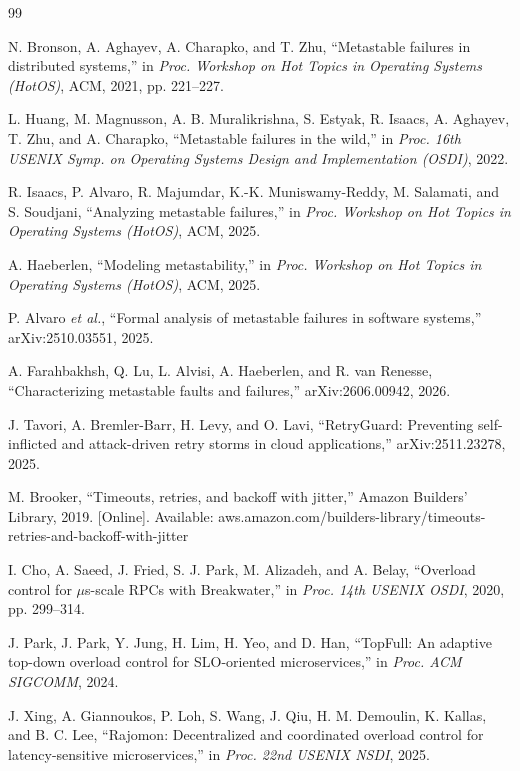 \documentclass[conference,a4paper]{IEEEtran}
\begin{document}
\begin{thebibliography}{99}

 N. Bronson, A. Aghayev, A. Charapko, and T. Zhu, ``Metastable failures in distributed systems,'' in \emph{Proc. Workshop on Hot Topics in Operating Systems (HotOS)}, ACM, 2021, pp. 221--227.

 L. Huang, M. Magnusson, A. B. Muralikrishna, S. Estyak, R. Isaacs, A. Aghayev, T. Zhu, and A. Charapko, ``Metastable failures in the wild,'' in \emph{Proc. 16th USENIX Symp. on Operating Systems Design and Implementation (OSDI)}, 2022.

 R. Isaacs, P. Alvaro, R. Majumdar, K.-K. Muniswamy-Reddy, M. Salamati, and S. Soudjani, ``Analyzing metastable failures,'' in \emph{Proc. Workshop on Hot Topics in Operating Systems (HotOS)}, ACM, 2025.

 A. Haeberlen, ``Modeling metastability,'' in \emph{Proc. Workshop on Hot Topics in Operating Systems (HotOS)}, ACM, 2025.

 P. Alvaro \emph{et al.}, ``Formal analysis of metastable failures in software systems,'' arXiv:2510.03551, 2025.

 A. Farahbakhsh, Q. Lu, L. Alvisi, A. Haeberlen, and R. van Renesse, ``Characterizing metastable faults and failures,'' arXiv:2606.00942, 2026.

 J. Tavori, A. Bremler-Barr, H. Levy, and O. Lavi, ``RetryGuard: Preventing self-inflicted and attack-driven retry storms in cloud applications,'' arXiv:2511.23278, 2025.

 M. Brooker, ``Timeouts, retries, and backoff with jitter,'' Amazon Builders' Library, 2019. [Online]. Available: aws.amazon.com/builders-library/timeouts-retries-and-backoff-with-jitter

 I. Cho, A. Saeed, J. Fried, S. J. Park, M. Alizadeh, and A. Belay, ``Overload control for $\mu$s-scale RPCs with Breakwater,'' in \emph{Proc. 14th USENIX OSDI}, 2020, pp. 299--314.

 J. Park, J. Park, Y. Jung, H. Lim, H. Yeo, and D. Han, ``TopFull: An adaptive top-down overload control for SLO-oriented microservices,'' in \emph{Proc. ACM SIGCOMM}, 2024.

 J. Xing, A. Giannoukos, P. Loh, S. Wang, J. Qiu, H. M. Demoulin, K. Kallas, and B. C. Lee, ``Rajomon: Decentralized and coordinated overload control for latency-sensitive microservices,'' in \emph{Proc. 22nd USENIX NSDI}, 2025.


\end{thebibliography}
\end{document}
